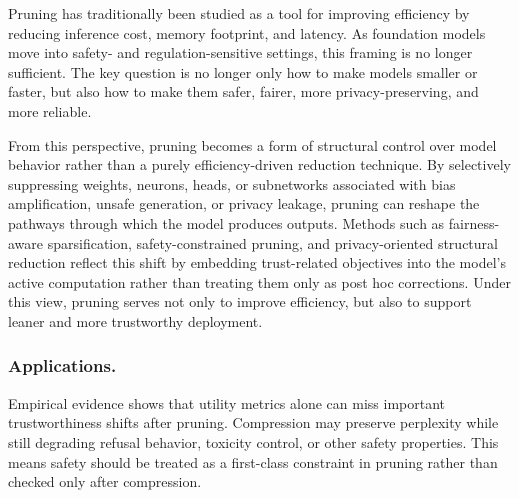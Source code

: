 Pruning has traditionally been studied as a tool for improving efficiency by reducing inference cost, memory footprint, and latency. As foundation models move into safety- and regulation-sensitive settings, this framing is no longer sufficient. The key question is no longer only how to make models smaller or faster, but also how to make them safer, fairer, more privacy-preserving, and more reliable.

From this perspective, pruning becomes a form of structural control over model behavior rather than a purely efficiency-driven reduction technique. By selectively suppressing weights, neurons, heads, or subnetworks associated with bias amplification, unsafe generation, or privacy leakage, pruning can reshape the pathways through which the model produces outputs. Methods such as fairness-aware sparsification, safety-constrained pruning, and privacy-oriented structural reduction reflect this shift by embedding trust-related objectives into the model's active computation rather than treating them only as post hoc corrections. Under this view, pruning serves not only to improve efficiency, but also to support leaner and more trustworthy deployment.

\subsubsection{Applications.}
\label{sec:pruning-dimensions}


Empirical evidence shows that utility metrics alone can miss important trustworthiness shifts after pruning. Compression may preserve perplexity while still degrading refusal behavior, toxicity control, or other safety properties. This means safety should be treated as a first-class constraint in pruning rather than checked only after compression.


